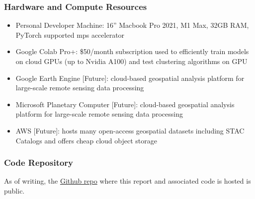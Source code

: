 \begin{multicols}{2}
\subsubsection{Hardware and Compute Resources}

\begin{itemize}
    \item Personal Developer Machine: 16'' Macbook Pro 2021, M1 Max, 32GB RAM, PyTorch supported mps accelerator
    \item Google Colab Pro+: \$50/month subscription used to efficiently train models on cloud GPUs (up to Nvidia A100) and test clustering algorithms on GPU
    \item Google Earth Engine [Future]: cloud-based geospatial analysis platform for large-scale remote sensing data processing 
    \item Microsoft Planetary Computer [Future]: cloud-based geospatial analysis platform for large-scale remote sensing data processing
    \item AWS [Future]: hosts many open-access geospatial datasets including STAC Catalogs and offers cheap cloud object storage
    
\end{itemize}

\subsubsection{Code Repository}

As of writing, the \href{https://github.com/avega17/CCOM_MS_Spring_2025_EO_PV_research}{Github repo} where this report and associated code is hosted is public.


\end{multicols}
